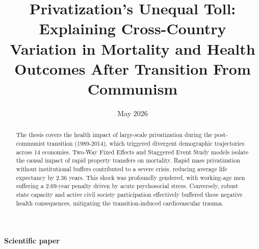 \documentclass[en,magisterska]{pracamgr}
\title{Privatization's Unequal Toll: Explaining Cross-Country Variation in Mortality and Health Outcomes After Transition From Communism}
\date{May 2026}
\renewcommand{\contentsname}{Table of Contents}
\begin{document}
\renewcommand{\contentsname}{Table of Contents}

\maketitle %


\begin{abstract}
\setcounter{page}{2}
The thesis covers the health impact of large-scale privatization during the post-communist transition (1989-2014), which triggered divergent demographic 
trajectories across 14 economies. Two-Way Fixed Effects and Staggered Event Study models isolate the causal impact of rapid property transfers on mortality. 
Rapid mass privatization without institutional buffers contributed to a severe crisis, reducing average life expectancy by 2.36 years. This shock was profoundly 
gendered, with working-age men suffering a 2.69-year penalty driven by acute psychosocial stress. Conversely, robust state capacity and active civil society participation 
effectively buffered these negative health consequences, mitigating the transition-induced cardiovascular trauma.
\end{abstract}

\tableofcontents

\cleardoublepage
\thispagestyle{empty} %
\vspace*{\fill}
\begin{center}
    \Huge \textbf{Scientific paper}
\end{center}
\vspace*{\fill}
\clearpage

\clearpage
\end{document}
